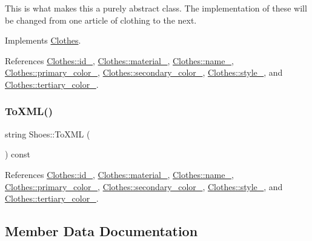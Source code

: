 This is what makes this a purely abstract class. The implementation of these will be changed from one article of clothing to the next. 

Implements \mbox{\hyperlink{classClothes_a953d143394e9a2c007ab0c3a638973cf}{Clothes}}.



References \mbox{\hyperlink{classClothes_a8978d931db5ca47c3ccea30def4ae83e}{Clothes\+::id\+\_\+}}, \mbox{\hyperlink{classClothes_adbb9ed311f14ccbb1e4fe0e8378a95d4}{Clothes\+::material\+\_\+}}, \mbox{\hyperlink{classClothes_a7f2275aaae24224d60c48af922c31b65}{Clothes\+::name\+\_\+}}, \mbox{\hyperlink{classClothes_a7cb005bf6cbb7f4eaa40f1b31817559c}{Clothes\+::primary\+\_\+color\+\_\+}}, \mbox{\hyperlink{classClothes_ab8f55f67b956b25d71260cffcf273673}{Clothes\+::secondary\+\_\+color\+\_\+}}, \mbox{\hyperlink{classClothes_aa85ed2b95110d8c477a1aca9cb403f98}{Clothes\+::style\+\_\+}}, and \mbox{\hyperlink{classClothes_a3c5f1e7ab531e3ba7a38b930da8078a0}{Clothes\+::tertiary\+\_\+color\+\_\+}}.

\mbox{\label{classShoes_acf6f049aa995a189b0f892f86defeefd}} 
\subsubsection{\texorpdfstring{To\+X\+M\+L()}{ToXML()}}
{\footnotesize\ttfamily string Shoes\+::\+To\+X\+ML (\begin{DoxyParamCaption}{ }\end{DoxyParamCaption}) const}



References \mbox{\hyperlink{classClothes_a8978d931db5ca47c3ccea30def4ae83e}{Clothes\+::id\+\_\+}}, \mbox{\hyperlink{classClothes_adbb9ed311f14ccbb1e4fe0e8378a95d4}{Clothes\+::material\+\_\+}}, \mbox{\hyperlink{classClothes_a7f2275aaae24224d60c48af922c31b65}{Clothes\+::name\+\_\+}}, \mbox{\hyperlink{classClothes_a7cb005bf6cbb7f4eaa40f1b31817559c}{Clothes\+::primary\+\_\+color\+\_\+}}, \mbox{\hyperlink{classClothes_ab8f55f67b956b25d71260cffcf273673}{Clothes\+::secondary\+\_\+color\+\_\+}}, \mbox{\hyperlink{classClothes_aa85ed2b95110d8c477a1aca9cb403f98}{Clothes\+::style\+\_\+}}, and \mbox{\hyperlink{classClothes_a3c5f1e7ab531e3ba7a38b930da8078a0}{Clothes\+::tertiary\+\_\+color\+\_\+}}.



\subsection{Member Data Documentation}
\mbox{\label{classClothes_ae2e5026257b3a2f2ddbf61757fd3b57b}} 
